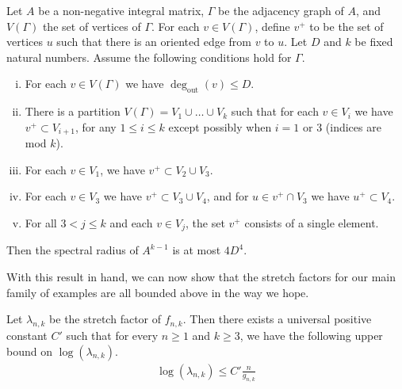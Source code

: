 \begin{lem}
\label{lem:spectral}
Let $A$ be a non-negative integral matrix, $\Gamma$ be the adjacency graph of $A$, and $V(\Gamma)$ the set of
vertices of $\Gamma$. For each $v \in V(\Gamma)$, define $v^+$ to be the set of vertices $u$ such that there
is an oriented edge from $v$ to $u$. Let $D$ and $k$ be fixed natural numbers. Assume the following conditions
hold for $\Gamma$.
\begin{enumerate}[(i)]
\item For each $v \in V(\Gamma)$ we have $\deg_{\text{out}}(v) \leq D$.
\item There is a partition $V(\Gamma) = V_1 \cup \dots \cup V_k$ such that for each $v \in V_i$ we have
  $v^+ \subset V_{i+1}$, for any $1 \leq i \leq k$ except possibly when $i = 1$ or 3 (indices are mod $k$).
\item For each $v \in V_1$, we have $v^+ \subset V_2 \cup V_3$.
\item For each $v \in V_3$ we have $v^+ \subset V_3 \cup V_4$, and for $u \in v^+ \cap V_3$ we have
  $u^+ \subset V_4$.
\item For all $3 < j \leq k$ and each $v \in V_j$, the set $v^+$ consists of a single element.
\end{enumerate}

Then the spectral radius of $A^{k-1}$ is at most $4D^4$.

\end{lem}
With this result in hand, we can now show that the stretch factors for our main family of examples are all
bounded above in the way we hope.

\begin{lem}
  Let $\lambda_{n,k}$ be the stretch factor of $f_{n,k}$. Then there exists a universal positive constant $C'$ such that for every $n \geq 1$ and $k \geq 3$, we have the following upper bound on $\log(\lambda_{n,k})$.
  \begin{align*}
   \log(\lambda_{n,k}) \leq C'\frac{n}{g_{n,k}}
  \end{align*}
\end{lem}


